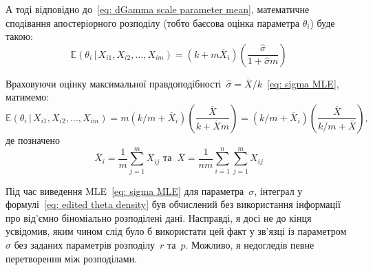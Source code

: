 \documentclass{mathreport}
\begin{document}
А тоді відповідно до~\eqref{eq: dGamma scale parameter mean}, математичне сподівання апостеріорного розподілу (тобто баєсова оцінка параметра $\theta_{i}$) буде такою:
\begin{equation}
    \mathbb{E}(\theta_i \,|\, X_{i1},X_{i2},\ldots,X_{im}) = \left( k+m\overline{X}_i \right)\left( \frac{\widehat{\sigma}}{1+\widehat{\sigma}m} \right)
\end{equation}

Враховуючи оцінку максимальної правдоподібності~$\widehat{\sigma}=\overline{X}/k$~\eqref{eq: sigma MLE}, матимемо:
\begin{equation}\label{eq: my BE}
    \mathbb{E}(\theta_i \,|\, X_{i1},X_{i2},\ldots,X_{im}) = m\left( k/m+\overline{X}_i \right)\left( \frac{\overline{X}}{k+\overline{X}m} \right) = \left( k/m+\overline{X}_i \right)\left( \frac{\overline{X}}{k/m+\overline{X}} \right),
\end{equation}
де позначено
\begin{equation}
    \overline{X}_i = \frac{1}{m} \sum\limits_{j=1}^{m} X_{ij} \text{ та } \    \overline{X} = \frac{1}{nm}\sum\limits_{i=1}^{n} \sum\limits_{j=1}^{m} X_{ij}
\end{equation}

\begin{remark}
    Під час виведення MLE~\eqref{eq: sigma MLE} для параметра~$\sigma$, інтеграл у формулі~\eqref{eq: edited theta density} був обчислений без використання інформації про від'ємно біноміально розподілені дані. Насправді, я досі не до кінця усвідомив, яким чином слід було б використати цей факт у зв'язці із параметром~$\sigma$ без заданих параметрів розподілу~$r$ та~$p$. Можливо, я недогледів певне перетворення між розподілами.
\end{remark}

\end{document}
